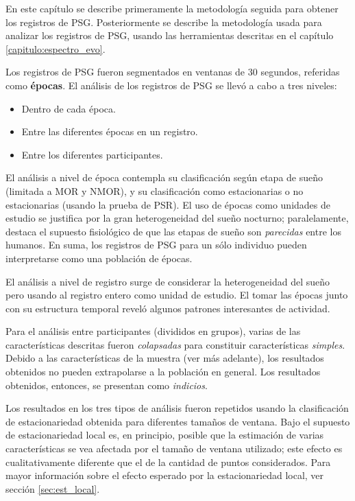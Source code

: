 \documentclass[12pt,letterpaper]{book}
\begin{document}
En este capítulo se describe primeramente la metodología seguida para obtener los registros de PSG.
%
Posteriormente se describe la metodología usada para analizar los registros de PSG, usando las herramientas descritas en el capítulo \ref{capitulo:espectro_evo}.

Los registros de PSG fueron segmentados en ventanas de 30 segundos, referidas como \textbf{épocas}.
%
El análisis de los registros de PSG se llevó a cabo a tres niveles:
\begin{itemize}
\item Dentro de cada época.
\item Entre las diferentes épocas en un registro.
\item Entre los diferentes participantes.
\end{itemize}

El análisis a nivel de época contempla su clasificación según etapa de sueño (limitada a MOR y NMOR), y su clasificación como estacionarias o no estacionarias (usando la prueba de PSR).
%
El uso de épocas como unidades de estudio se justifica por la gran heterogeneidad del sueño nocturno; paralelamente, destaca el supuesto fisiológico de que las etapas de sueño son \textit{parecidas} entre los humanos.
%
En suma, los registros de PSG para un sólo individuo pueden interpretarse como una población de épocas.

El análisis a nivel de registro surge de considerar la heterogeneidad del sueño pero usando al registro entero como unidad de estudio.
%
El tomar las épocas junto con su estructura temporal reveló algunos patrones interesantes de actividad.

Para el análisis entre participantes (divididos en grupos), varias de las características descritas fueron \textit{colapsadas} para constituir características \textit{simples}. 
%
Debido a las características de la muestra (ver más adelante), los resultados obtenidos no pueden extrapolarse a la población en general.
%
Los resultados obtenidos, entonces, se presentan como \textit{indicios}.

Los resultados en los tres tipos de análisis fueron repetidos usando la clasificación de estacionariedad obtenida para diferentes tamaños de ventana.
%
Bajo el supuesto de estacionariedad local es, en principio, posible que la estimación de varias características se vea afectada por el tamaño de ventana utilizado; este efecto es cualitativamente diferente que el de la cantidad de puntos considerados.
%
Para mayor información sobre el efecto esperado por la estacionariedad local, ver sección \ref{sec:est_local}.
\end{document}
